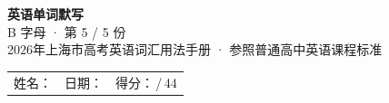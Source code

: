\documentclass[10pt,a4paper]{article}
\begin{document}
\pagestyle{plain}

\begin{center}
{\LARGE\bfseries 英语单词默写}\\[0.22em]
{\large B 字母 · 第 5 / 5 份}\\[0.18em]
{\small 2026年上海市高考英语词汇用法手册 · 参照普通高中英语课程标准}
\end{center}

\vspace{0.25em}
\noindent\begin{tabular}{@{}p{}@{}p{}@{}p{}@{}}
姓名：\underline{\hspace{2.0cm}} & 日期：\underline{\hspace{2.0cm}} & 得分：\underline{\hspace{1.3cm}}\,/\,44 \\
\end{tabular}

\vspace{0.3em}

\vspace{0.08em}
\end{document}
